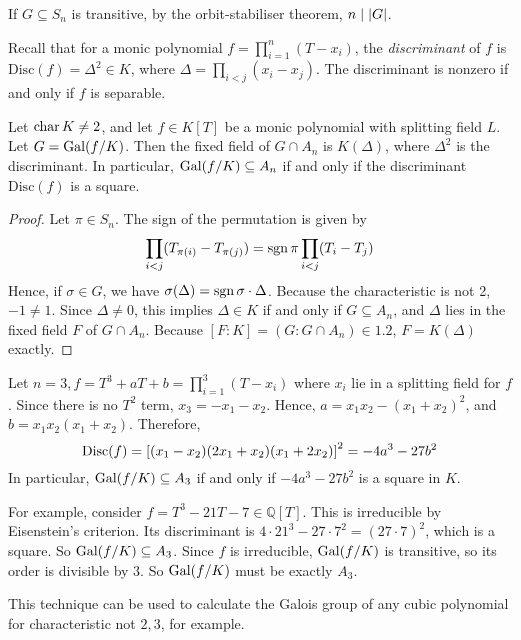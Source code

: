 \begin{remark}
	If \( G \subseteq S_n \) is transitive, by the orbit-stabiliser theorem, \( n \mid \abs{G} \).
\end{remark}
Recall that for a monic polynomial \( f = \prod_{i=1}^n (T - x_i) \), the \emph{discriminant} of \( f \) is \( \mathrm{Disc}(f) = \Delta^2 \in K \), where \( \Delta = \prod_{i < j} (x_i - x_j) \).
The discriminant is nonzero if and only if \( f \) is separable.
\begin{proposition}
	Let \( \operatorname{char} K \neq 2 \), and let \( f \in K[T] \) be a monic polynomial with splitting field \( L \).
	Let \( G = \operatorname{Gal}(f/K) \).
	Then the fixed field of \( G \cap A_n \) is \( K(\Delta) \), where \( \Delta^2 \) is the discriminant.
	In particular, \( \operatorname{Gal}(f/K) \subseteq A_n \) if and only if the discriminant \( \mathrm{Disc}(f) \) is a square.
\end{proposition}
\begin{proof}
	Let \( \pi \in S_n \).
	The sign of the permutation is given by
	\[ \prod_{i < j} (T_{\pi(i)} - T_{\pi(j)}) = \operatorname{sgn} \pi \prod_{i < j} (T_i - T_j) \]
	Hence, if \( \sigma \in G \), we have \( \sigma(\Delta) = \operatorname{sgn} \sigma \cdot \Delta \).
	Because the characteristic is not 2, \( -1 \neq 1 \).
	Since \( \Delta \neq 0 \), this implies \( \Delta \in K \) if and only if \( G \subseteq A_n \), and \( \Delta \) lies in the fixed field \( F \) of \( G \cap A_n \).
	Because \( [F : K] = (G : G \cap A_n) \in \qty{1, 2} \), \( F = K(\Delta) \) exactly.
\end{proof}
\begin{example}
	Let \( n = 3, f = T^3 + aT + b = \prod_{i=1}^3 (T - x_i) \) where \( x_i \) lie in a splitting field for \( f \).
	Since there is no \( T^2 \) term, \( x_3 = -x_1 - x_2 \).
	Hence, \( a = x_1 x_2 - (x_1 + x_2)^2 \), and \( b = x_1x_2(x_1 + x_2) \).
	Therefore,
	\[ \mathrm{Disc}(f) = \qty[(x_1-x_2)(2x_1+x_2)(x_1+2x_2)]^2 = -4a^3 - 27b^2 \]
	In particular, \( \operatorname{Gal}(f/K) \subseteq A_3 \) if and only if \( -4a^3 - 27b^2 \) is a square in \( K \).

	For example, consider \( f = T^3 - 21T - 7 \in \mathbb Q[T] \).
	This is irreducible by Eisenstein's criterion.
	Its discriminant is \( 4 \cdot 21^3 - 27 \cdot 7^2 = (27 \cdot 7)^2 \), which is a square.
	So \( \operatorname{Gal}(f/K) \subseteq A_3 \).
	Since \( f \) is irreducible, \( \operatorname{Gal}(f/K) \) is transitive, so its order is divisible by 3.
	So \( \operatorname{Gal}(f/K) \) must be exactly \( A_3 \).
\end{example}
\begin{remark}
	This technique can be used to calculate the Galois group of any cubic polynomial for characteristic not \( 2, 3 \), for example.
\end{remark}
